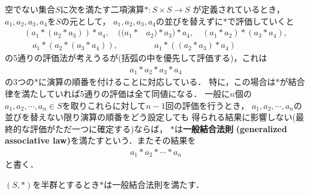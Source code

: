 	\begin{screen}
		\begin{dfn}[一般結合法則]
			空でない集合$S$に次を満たす二項演算$\ast:S \times S \longrightarrow S$
			が定義されているとき，$a_1,a_2,a_3,a_4$を$S$の元として，
			$a_1,a_2,a_3,a_4$の並びを替えずに$\ast$で評価していくと
			\begin{align}
				(a_1 \ast (a_2 \ast a_3)) \ast a_4,
				\quad ((a_1 \ast &a_2) \ast a_3) \ast a_4,
				\quad (a_1 \ast a_2) \ast (a_3 \ast a_4), \\
				\quad a_1 \ast (a_2 \ast (a_3 \ast a_4)),
				&\quad a_1 \ast ((a_2 \ast a_3) \ast a_4)
			\end{align}
			の5通りの評価法が考えうるが(括弧の中を優先して評価する)，これは
			\begin{align}
				a_1 \ast a_2 \ast a_3 \ast a_4
			\end{align}
			の3つの$\ast$に演算の順番を付けることに対応している．
			特に，この場合は$\ast$が結合律を満たしていれば5通りの評価は全て同値になる．
			一般に$n$個の$a_1,a_2,\cdots,a_n \in S$を取りこれらに対して$n-1$回の評価を行うとき，
			$a_1,a_2,\cdots,a_n$の並びを替えない限り演算の順番をどう設定しても
			得られる結果に影響しない(最終的な評価がただ一つに確定する)ならば，
			$\ast$は{\bf 一般結合法則}
			{\bf (generalized associative law)}を満たすという．またその結果を
			\begin{align}
				a_1 \ast a_2 \ast \cdots \ast a_n
			\end{align}
			と書く．
		\end{dfn}
	\end{screen}
	
	\begin{screen}
		\begin{thm}[結合法則から一般結合法則が従う]
		\label{thm:generalized_associative_law_on_semigroup}
			$(S,\ast)$を半群とするとき$\ast$は一般結合法則を満たす．
		\end{thm}
	\end{screen}
	
